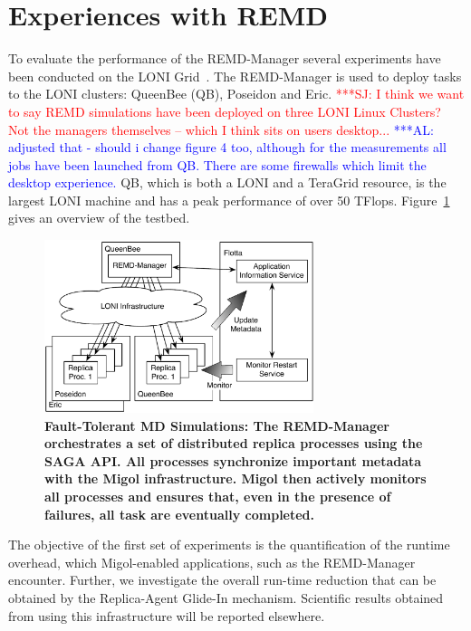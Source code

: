 \documentclass{rspublic}
\newcommand{\alnote}[1]{ {\textcolor{blue} { ***AL: #1 }}}
\newcommand{\jhanote}[1]{ {\textcolor{red} { ***SJ: #1 }}}
\newcommand{\alnote}[1]{}
\newcommand{\jhanote}[1]{}
\newcommand{\glidein}[1]{Glide-In }
\newcommand{\replicaagent}[1]{Replica-Agent }
\begin{document}
\section{Experiences with REMD}
\label{sec:exp}       
        
To evaluate the performance of the REMD-Manager several
experiments have been conducted on the LONI
Grid~\citep{loni}. The REMD-Manager is used to deploy tasks to
the LONI clusters: QueenBee (QB), Poseidon and Eric.  \jhanote{I think
  we want to say REMD simulations have been deployed on three LONI
  Linux Clusters? Not the managers themselves -- which I think sits on
  users desktop...}  \alnote{adjusted that - should i change figure 4
  too, although for the measurements all jobs have been launched from
  QB. There are some firewalls which limit the desktop experience.}
QB, which is both a LONI and a TeraGrid resource, is the largest LONI
machine and has a peak performance of over 50 TFlops.
Figure~\ref{fig:saga-taskfarming} gives an overview of the testbed.

\begin{figure}[t]
    \centering
        \includegraphics[width=0.7\textwidth]{saga-taskfarming}
        \caption{\footnotesize \bf Fault-Tolerant MD Simulations: The
          REMD-Manager orchestrates a set of distributed replica
          processes using the SAGA API. All processes synchronize
          important metadata with the Migol infrastructure. Migol then
          actively monitors all processes and ensures that, even in
          the presence of failures, all task are eventually
          completed.}
    \label{fig:saga-taskfarming}
\end{figure} 
The objective of the first set of experiments is the
quantification of the runtime overhead, which Migol-enabled
applications, such as the REMD-Manager encounter.  Further, we investigate the 
overall run-time reduction that can be obtained by the \replicaagent\ \glidein\
mechanism. Scientific results obtained from using this infrastructure will be reported elsewhere.
    
\end{document}
